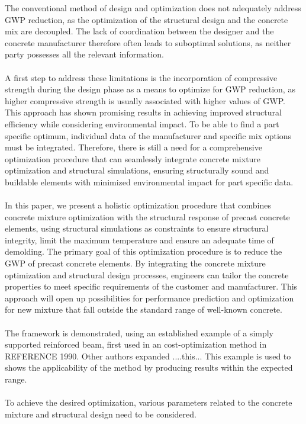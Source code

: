 The conventional method of design and optimization does not adequately address GWP reduction, as the optimization of the structural design and the concrete mix are decoupled.
The lack of coordination between the designer and the concrete manufacturer therefore often leads to suboptimal solutions, as neither party possesses all the relevant information.\\\\
%
A first step to address these limitations is the incorporation of compressive strength during the design phase as a means to optimize for GWP reduction, as higher compressive strength is usually associated with higher values of GWP. 
This approach has shown promising results in achieving improved structural efficiency while considering environmental impact.
To be able to find a part specific optimum, individual data of the manufacturer and specific mix options must be integrated.
Therefore, there is still a need for a comprehensive optimization procedure that can seamlessly integrate concrete mixture optimization and structural simulations, ensuring structurally sound and buildable elements with minimized environmental impact for part specific data.\\\\
%
In this paper, we present a holistic optimization procedure that combines concrete mixture optimization with the structural response of precast concrete elements, using structural simulations as constraints to ensure structural integrity, limit the maximum temperature and ensure an adequate time of demolding.
The primary goal of this optimization procedure is to reduce the GWP of precast concrete elements. 
By integrating the concrete mixture optimization and structural design processes, engineers can tailor the concrete properties to meet specific requirements of the customer and manufacturer.
This approach will open up possibilities for performance prediction and optimization for new mixture that fall outside the standard range of well-known concrete.\\\\
The framework is demonstrated, using an established example of a simply supported reinforced beam, first used in an cost-optimization method in REFERENCE 1990.
Other authors expanded ....this...
This example is used to shows the applicability of the method by producing results within the expected range.\\\\
%
To achieve the desired optimization, various parameters related to the concrete mixture and structural design need to be considered.
